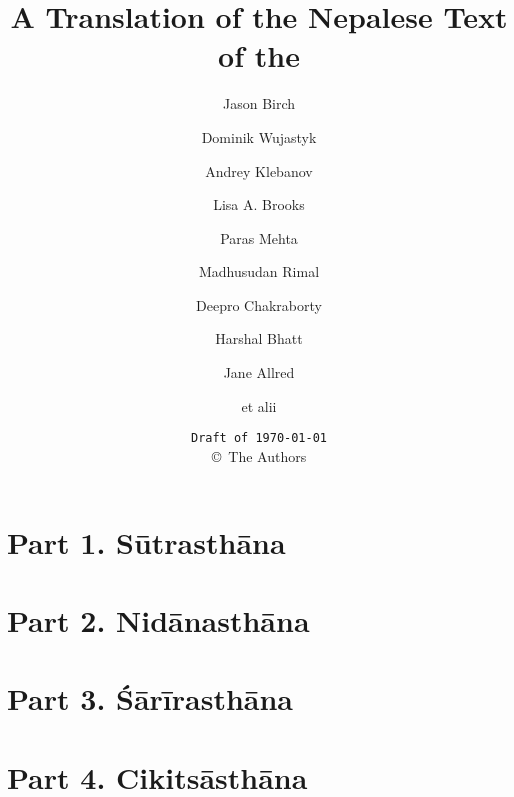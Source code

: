 \documentclass[12pt,draft]{book} %
\title{A Translation of the Nepalese Text of the \SS}
\author{Jason Birch 
    \and Dominik Wujastyk 
    \and Andrey Klebanov
    \and Lisa A. Brooks 
    \and Paras Mehta 
    \and Madhusudan Rimal
    \and Deepro Chakraborty
    \and Harshal Bhatt
    \and Jane Allred
    \and et alii}
\date{\texttt{Draft of \today}\\ \copyright\ The Authors}
\begin{document}
    
    
        
    \pagecolor{cyan}
    \thispagestyle{empty}
          \maketitle

        \newpage
        \pagecolor{white}
        \tableofcontents
        
        
            \thispagestyle{empty}
        
        \part{Part 1. Sūtrasthāna} 
                        
        
            \thispagestyle{empty}
        
            \thispagestyle{empty}
        
            \thispagestyle{empty}
            \thispagestyle{empty}
            \thispagestyle{empty}
       
            \thispagestyle{empty}
        
            \thispagestyle{empty}
        
        \part{Part 2. Nidānasthāna}
        
        
            \thispagestyle{empty}
        
        \part{Part 3. Śārīrasthāna}
        
            \thispagestyle{empty}
        
        \part{Part 4. Cikitsāsthāna}
        
        
            \thispagestyle{empty}
        
            \thispagestyle{empty}
        
            \thispagestyle{empty}
        
\end{document}
